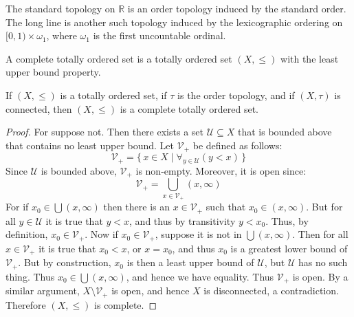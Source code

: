 \documentclass{article}                                                        %
\begin{document}
        \begin{example}
                The standard topology on $\mathbb{R}$ is an order topology
                induced by the standard order. The long line is another such
                topology induced by the lexicographic ordering on
                $[0,1)\times\omega_{1}$, where $\omega_{1}$ is the first
                uncountable ordinal.
        \end{example}
        \begin{definition}
                A complete totally ordered set is a totally ordered set
                $(X,\leq)$ with the least upper bound property.
        \end{definition}
        \begin{theorem}
                If $(X,\leq)$ is a totally ordered set, if $\tau$ is the order
                topology, and if $(X,\tau)$ is connected, then $(X,\leq)$ is
                a complete totally ordered set.
        \end{theorem}
        \begin{proof}
            For suppose not. Then there exists a set
            $\mathcal{U}\subseteq{X}$ that is bounded above that contains
            no least upper bound. Let $\mathcal{V}_{+}$ be defined as
            follows:
            \begin{equation}
                \mathcal{V}_{+}=\{\,x\in{X}\;|\;
                    \forall_{y\in\mathcal{U}}(y<x)\,\}
            \end{equation}
            Since $\mathcal{U}$ is bounded above, $\mathcal{V}_{+}$ is
            non-empty. Moreover, it is open since:
            \begin{equation}
                \mathcal{V}_{+}=
                \bigcup_{x\in\mathcal{V}_{+}}(x,\infty)
            \end{equation}
            For if $x_{0}\in\bigcup(x,\infty)$ then there is an
            $x\in\mathcal{V}_{+}$ such that $x_{0}\in(x,\infty)$. But
            for all $y\in\mathcal{U}$ it is true that $y<x$, and thus by
            transitivity $y<x_{0}$. Thus, by definition,
            $x_{0}\in\mathcal{V}_{+}$. Now if $x_{0}\in\mathcal{V}_{+}$,
            suppose it is not in $\bigcup(x,\infty)$. Then for all
            $x\in\mathcal{V}_{+}$ it is true that $x_{0}<x$, or $x=x_{0}$,
            and thus $x_{0}$ is a greatest lower bound of $\mathcal{V}_{+}$.
            But by construction, $x_{0}$ is then a least upper bound of
            $\mathcal{U}$, but $\mathcal{U}$ has no such thing. Thus
            $x_{0}\in\bigcup(x,\infty)$, and hence we have equality.
            Thus $\mathcal{V}_{+}$ is open. By a similar argument,
            ${X}\setminus\mathcal{V}_{+}$ is open, and hence $X$ is
            disconnected, a contradiction. Therefore $(X,\leq)$ is complete.
        \end{proof}
\end{document}
